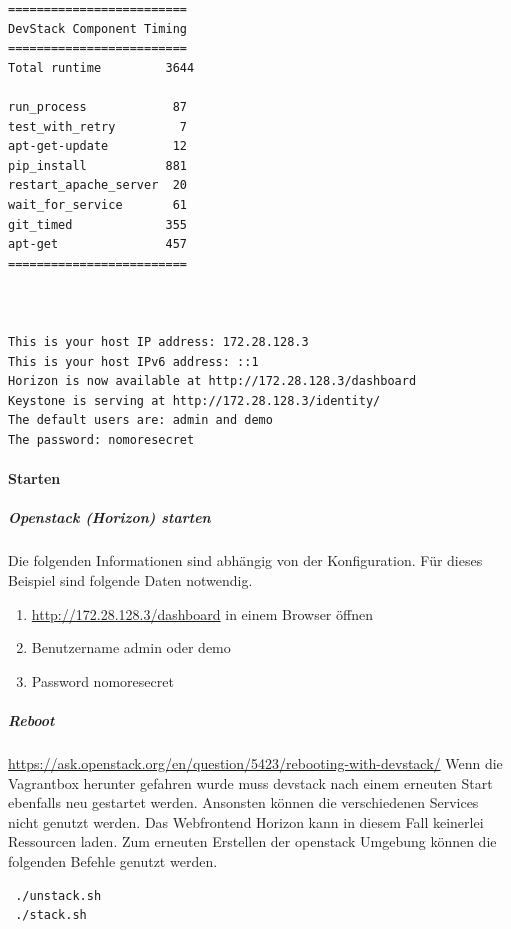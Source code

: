 \documentclass[a4paper,10pt]{article}
\numberwithin{figure}{section}
\numberwithin{table}{section}
\begin{document}
\begin{minipage}{\textwidth}
\begin{lstlisting}[frame=single,caption=Ausgabe von DevStack, breaklines=true]
=========================
DevStack Component Timing
=========================
Total runtime         3644

run_process            87
test_with_retry         7
apt-get-update         12
pip_install           881
restart_apache_server  20
wait_for_service       61
git_timed             355
apt-get               457
=========================



This is your host IP address: 172.28.128.3
This is your host IPv6 address: ::1
Horizon is now available at http://172.28.128.3/dashboard
Keystone is serving at http://172.28.128.3/identity/
The default users are: admin and demo
The password: nomoresecret
\end{lstlisting}
\end{minipage}

\paragraph{Starten}

\subparagraph{Openstack (Horizon) starten}

Die folgenden Informationen sind abhängig von der Konfiguration.
Für dieses Beispiel sind folgende Daten notwendig.

\begin{enumerate}
 \item \url{http://172.28.128.3/dashboard} in einem Browser öffnen
 \item Benutzername admin oder demo
 \item Password nomoresecret
\end{enumerate}

\subparagraph{Reboot}

\url{https://ask.openstack.org/en/question/5423/rebooting-with-devstack/}
Wenn die Vagrantbox herunter gefahren wurde muss devstack nach einem erneuten Start ebenfalls neu gestartet werden.
Ansonsten können die verschiedenen Services nicht genutzt werden.
Das Webfrontend Horizon kann in diesem Fall keinerlei Ressourcen laden.
Zum erneuten Erstellen der openstack Umgebung können die folgenden Befehle genutzt werden.

\begin{verbatim}
 ./unstack.sh
 ./stack.sh
\end{verbatim}
\end{document}
